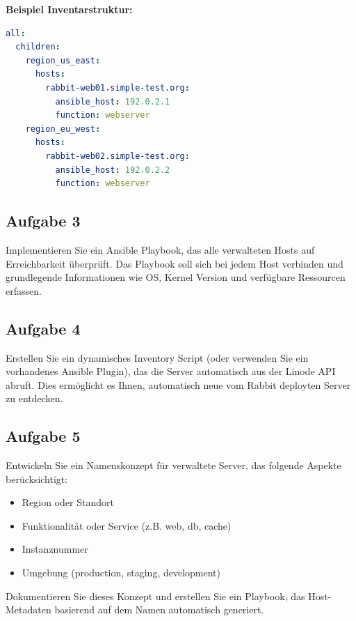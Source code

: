 \documentclass{article}
\begin{document}
    \textbf{Beispiel Inventarstruktur:}
    \begin{lstlisting}[language=yaml]
all:
  children:
    region_us_east:
      hosts:
        rabbit-web01.simple-test.org:
          ansible_host: 192.0.2.1
          function: webserver
    region_eu_west:
      hosts:
        rabbit-web02.simple-test.org:
          ansible_host: 192.0.2.2
          function: webserver
    \end{lstlisting}

    \subsection{Aufgabe 3}
    Implementieren Sie ein Ansible Playbook, das alle verwalteten Hosts auf Erreichbarkeit überprüft.
    Das Playbook soll sich bei jedem Host verbinden und grundlegende Informationen wie OS, Kernel Version und verfügbare Ressourcen erfassen.

    \subsection{Aufgabe 4}
    Erstellen Sie ein dynamisches Inventory Script (oder verwenden Sie ein vorhandenes Ansible Plugin),
    das die Server automatisch aus der Linode API abruft.
    Dies ermöglicht es Ihnen, automatisch neue vom Rabbit deployten Server zu entdecken.

    \subsection{Aufgabe 5}
    Entwickeln Sie ein Namenskonzept für verwaltete Server, das folgende Aspekte berücksichtigt:
    \begin{itemize}
        \item Region oder Standort
        \item Funktionalität oder Service (z.B. web, db, cache)
        \item Instanznummer
        \item Umgebung (production, staging, development)
    \end{itemize}
    
    Dokumentieren Sie dieses Konzept und erstellen Sie ein Playbook, das Host-Metadaten basierend auf dem Namen automatisch generiert.
\end{document}
